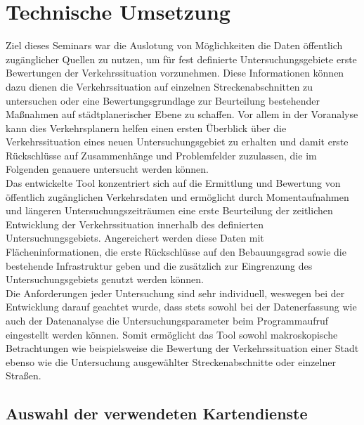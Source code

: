 \section{Technische Umsetzung}

Ziel dieses Seminars war die Auslotung von Möglichkeiten die Daten öffentlich zugänglicher Quellen zu nutzen, um für fest definierte Untersuchungsgebiete erste Bewertungen der Verkehrssituation vorzunehmen. Diese Informationen können dazu dienen die Verkehrssituation auf einzelnen Streckenabschnitten zu untersuchen oder eine Bewertungsgrundlage zur Beurteilung bestehender Maßnahmen auf städtplanerischer Ebene zu schaffen. Vor allem in der Voranalyse kann dies Verkehrsplanern helfen einen ersten Überblick über die Verkehrssituation eines neuen Untersuchungsgebiet zu erhalten und damit erste Rückschlüsse auf Zusammenhänge und Problemfelder zuzulassen, die im Folgenden genauere untersucht werden können.\\

Das entwickelte Tool konzentriert sich auf die Ermittlung und Bewertung von öffentlich zugänglichen Verkehrsdaten und ermöglicht durch Momentaufnahmen und längeren Untersuchungszeiträumen eine erste Beurteilung der zeitlichen Entwicklung der Verkehrssituation innerhalb des definierten Untersuchungsgebiets. Angereichert werden diese Daten mit Flächeninformationen, die erste Rückschlüsse auf den Bebauungsgrad sowie die bestehende Infrastruktur geben und die zusätzlich zur Eingrenzung des Untersuchungsgebiets genutzt werden können.\\

Die Anforderungen jeder Untersuchung sind sehr individuell, weswegen bei der Entwicklung darauf geachtet wurde, dass stets sowohl bei der Datenerfassung wie auch der Datenanalyse die Untersuchungsparameter beim Programmaufruf eingestellt werden können. Somit ermöglicht das Tool sowohl makroskopische Betrachtungen wie beispielsweise die Bewertung der Verkehrssituation einer Stadt ebenso wie die Untersuchung ausgewählter Streckenabschnitte oder einzelner Straßen.

\subsection{Auswahl der verwendeten Kartendienste}
\label{sec:kartendienste}

